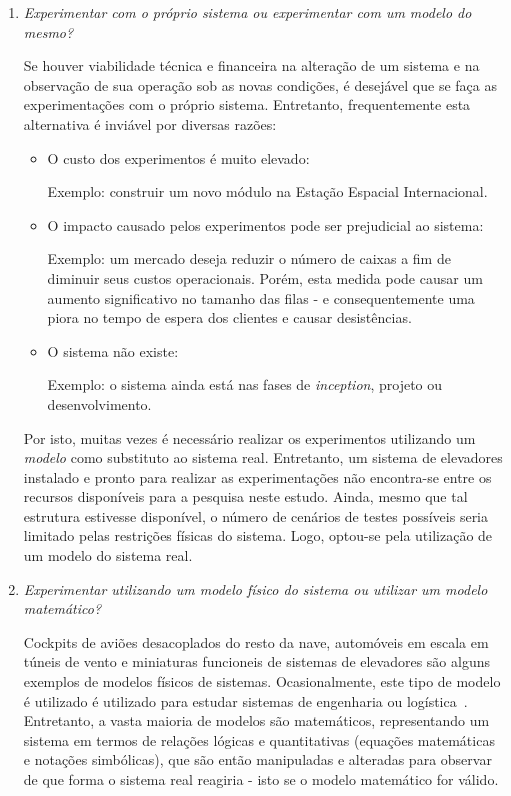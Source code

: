 \begin{enumerate}
\item \textit{Experimentar com o próprio sistema ou experimentar com um modelo do mesmo?}

Se houver viabilidade técnica e financeira na alteração de um sistema e na
observação de sua operação sob as novas condições, é desejável que se faça as
experimentações com o próprio sistema. Entretanto, frequentemente esta
alternativa é inviável por diversas razões:

\begin{itemize}
  \item O custo dos experimentos é muito elevado:

  Exemplo: construir um novo módulo na Estação Espacial Internacional.

  \item O impacto causado pelos experimentos pode ser prejudicial ao sistema:

  Exemplo: um mercado deseja reduzir o número de caixas a fim de diminuir seus
custos operacionais. Porém, esta medida pode causar um aumento significativo no
tamanho das filas - e consequentemente uma piora no tempo de espera dos clientes
e causar desistências.

  \item O sistema não existe:

  Exemplo: o sistema ainda está nas fases de \textit{inception}, projeto ou
  desenvolvimento.
\end{itemize}

Por isto, muitas vezes é necessário realizar os experimentos utilizando um
\textit{modelo} como substituto ao sistema real. Entretanto, um sistema de
elevadores instalado e pronto para realizar as experimentações não encontra-se
entre os recursos disponíveis para a pesquisa neste estudo. Ainda, mesmo que tal
estrutura estivesse disponível, o número de cenários de testes possíveis seria
limitado pelas restrições físicas do sistema. Logo, optou-se pela utilização de
um modelo do sistema real.

\item \textit{Experimentar utilizando um modelo físico do sistema ou utilizar um modelo
matemático?}

Cockpits de aviões desacoplados do resto da nave, automóveis em escala em túneis
de vento e miniaturas funcioneis de sistemas de elevadores são alguns exemplos
de modelos físicos de sistemas. Ocasionalmente, este tipo de modelo é utilizado
é utilizado para estudar sistemas de engenharia ou logística~\cite{Law}.
Entretanto, a vasta maioria de modelos são matemáticos, representando um sistema
em termos de relações lógicas e quantitativas (equações matemáticas e notações
simbólicas), que são então manipuladas e alteradas para observar de que forma o
sistema real reagiria - isto se o modelo matemático for válido.


\end{enumerate}
